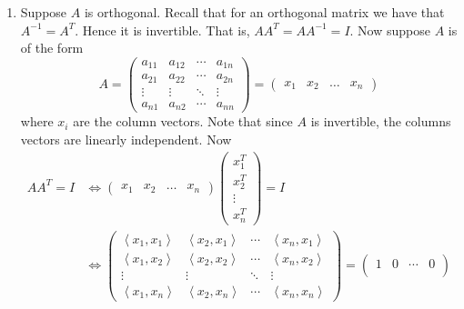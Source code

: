 \documentclass[12pt,letterpaper,boxed]{math_hw_pset}
\newcommand{\<}{\left<}
\renewcommand{\>}{\right>}
\begin{document}
\begin{solution}
    \begin{enumerate}
        \item Suppose $A$ is orthogonal. Recall that for an orthogonal matrix 
        we have that $A^{-1} = A^{T}$. Hence it is invertible. That is, $AA^{T} = AA^{-1} = I$. 
        Now suppose $A$ is of the form
        \[
            A = 
            \begin{pmatrix}
                a_{11} & a_{12} & \cdots & a_{1n}\\
                a_{21} & a_{22} & \cdots & a_{2n}\\
                \vdots & \vdots & \ddots & \vdots \\
                a_{n1} & a_{n2} & \cdots & a_{nn}
            \end{pmatrix}
            = 
            \begin{pmatrix}
                x_1 & x_2 & \dots & x_n
            \end{pmatrix}
        \]
        where $x_i$ are the column vectors. Note that since $A$ is invertible, the 
        columns vectors are linearly independent.
        Now
        \begin{align*}
            AA^{T} = I &\iff
            \begin{pmatrix}
                x_1 & x_2 & \dots & x_n
            \end{pmatrix}
            \begin{pmatrix}
                x_1^T \\
                x_2^T\\
                \vdots\\
                x_n^T
            \end{pmatrix}
            = I\\
            &\iff
            \begin{pmatrix}
                \left<x_1, x_1 \right> & \left<x_2, x_1\right> & \cdots & \left<x_n, x_1 \right>\\
                \left<x_1, x_2 \right> & \left<x_2, x_2 \right> & \cdots & \left<x_n, x_2  \right>\\
                \vdots & \vdots & \ddots & \vdots\\
                \left<x_1, x_n \right>& \left<x_2, x_n \right> & \cdots & \left<x_n, x_n \right>
            \end{pmatrix}
            = 
            \begin{pmatrix}
                1 & 0 & \cdots & 0\\

\end{pmatrix}
\end{align*}
\end{enumerate}
\end{solution}
\end{document}
